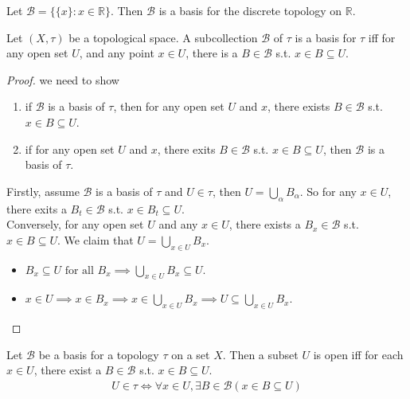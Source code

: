 \begin{example}
    Let $\mathcal{B} = \{\{x\}: x \in \mathbb{R}\}$.
    Then $\mathcal{B}$ is a basis for the discrete topology on $\mathbb{R}$.
\end{example}

\begin{proposition}{}{}
    Let $(X,\tau)$ be a topological space. A subcollection $\mathcal{B}$ of
    $\tau$ is a basis for $\tau$ iff
    for any open set $U$, and any point $x \in U$, there is a $B \in
    \mathcal{B}$ s.t. $x \in B \subseteq U$.
\end{proposition}

\begin{proof}
    we need to show
    \begin{enumerate}

        \item if $\mathcal{B}$ is a basis of $\tau$, then for any
            open set $U$ and $x$, there exists $B \in \mathcal{B}$
            s.t. $x \in B \subseteq U$.
        \item if for any open set $U$ and $x$, there exits $B \in
            \mathcal{B}$ s.t. $x \in B \subseteq U$, then
            $\mathcal{B}$ is a basis of $\tau$.

    \end{enumerate}
    Firstly, assume $\mathcal{B}$ is a basis of $\tau$ and $U \in
    \tau$, then $U = \bigcup_{\alpha} B_{\alpha}$. So for any $x \in
    U$, there exits a $B_{t} \in \mathcal{B}$ s.t. $x \in B_{t} \subseteq U$.\\
    Conversely, for any open set $U$ and any $x \in U$,
    there exists a $B_{x} \in \mathcal{B}$ s.t. $x \in B \subseteq
    U$. We claim that $U = \bigcup_{x \in U} B_{x}$.
    \begin{itemize}
        \item $B_{x} \subseteq U \text{ for all } B_{x} \implies
            \bigcup_{x \in U} B_{x} \subseteq U$.
        \item $x \in U \implies x \in B_{x} \implies x \in \bigcup_{x
            \in U} B_{x} \implies U \subseteq \bigcup_{x \in U} B_{x}$.
    \end{itemize}
\end{proof}

\begin{proposition}{}{}
    \label{pro:open sets are unions of elements of basis}
    Let $\mathcal{B}$ be a basis for a topology $\tau$ on a set $X$.
    Then a subset $U$ is open iff for each $x \in U$, there exist a
    $B \in \mathcal{B}$ s.t. $x \in B \subseteq U$.
    \begin{align*}
        U \in \tau \iff \forall x \in U, \exists B \in \mathcal{B} (x
        \in B \subseteq U)
    \end{align*}
\end{proposition}

